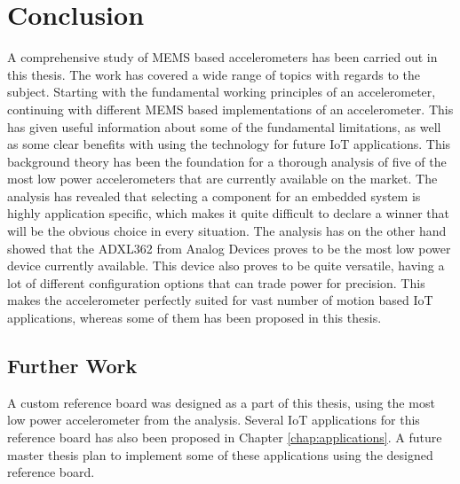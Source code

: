 \chapter{Conclusion}

A comprehensive study of MEMS based accelerometers has been carried out in this thesis. The work has covered a wide range of topics with regards to the subject. Starting with the fundamental working principles of an accelerometer, continuing with different MEMS based implementations of an accelerometer. This has given useful information about some of the fundamental limitations, as well as some clear benefits with using the technology for future IoT applications. This background theory has been the foundation for a thorough analysis of five of the most low power accelerometers that are currently available on the market. The analysis has revealed that selecting a component for an embedded system is highly application specific, which makes it quite difficult to declare a winner that will be the obvious choice in every situation. The analysis has on the other hand showed that the ADXL362 from Analog Devices proves to be the most low power device currently available. This device also proves to be quite versatile, having a lot of different configuration options that can trade power for precision. This makes the accelerometer perfectly suited for vast number of motion based IoT applications, whereas some of them has been proposed in this thesis. 

\section{Further Work}

A custom reference board was designed as a part of this thesis, using the most low power accelerometer from the analysis. Several IoT applications for this reference board has also been proposed in Chapter \ref{chap:applications}. A future master thesis plan to implement some of these applications using the designed reference board. 
